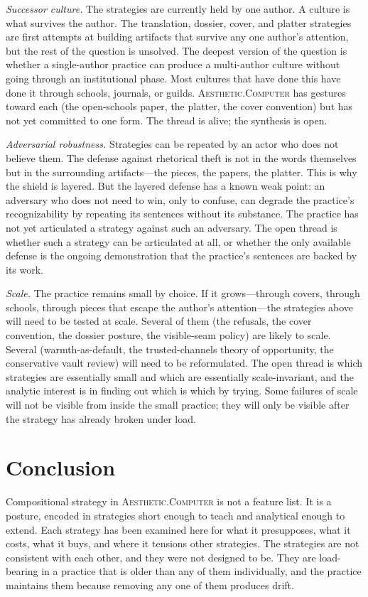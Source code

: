 \documentclass[10pt,letterpaper,twocolumn]{article}
\newcommand{\ac}{\textsc{Aesthetic.Computer}}
\begin{document}
\emph{Successor culture.} The strategies are currently held by one author. A culture is what survives the author. The translation, dossier, cover, and platter strategies are first attempts at building artifacts that survive any one author's attention, but the rest of the question is unsolved. The deepest version of the question is whether a single-author practice can produce a multi-author culture without going through an institutional phase. Most cultures that have done this have done it through schools, journals, or guilds. \ac{} has gestures toward each (the open-schools paper, the platter, the cover convention) but has not yet committed to one form. The thread is alive; the synthesis is open.

\emph{Adversarial robustness.} Strategies can be repeated by an actor who does not believe them. The defense against rhetorical theft is not in the words themselves but in the surrounding artifacts---the pieces, the papers, the platter. This is why the shield is layered. But the layered defense has a known weak point: an adversary who does not need to win, only to confuse, can degrade the practice's recognizability by repeating its sentences without its substance. The practice has not yet articulated a strategy against such an adversary. The open thread is whether such a strategy can be articulated at all, or whether the only available defense is the ongoing demonstration that the practice's sentences are backed by its work.

\emph{Scale.} The practice remains small by choice. If it grows---through covers, through schools, through pieces that escape the author's attention---the strategies above will need to be tested at scale. Several of them (the refusals, the cover convention, the dossier posture, the visible-seam policy) are likely to scale. Several (warmth-as-default, the trusted-channels theory of opportunity, the conservative vault review) will need to be reformulated. The open thread is which strategies are essentially small and which are essentially scale-invariant, and the analytic interest is in finding out which is which by trying. Some failures of scale will not be visible from inside the small practice; they will only be visible after the strategy has already broken under load.

\section{Conclusion}

Compositional strategy in \ac{} is not a feature list. It is a posture, encoded in strategies short enough to teach and analytical enough to extend. Each strategy has been examined here for what it presupposes, what it costs, what it buys, and where it tensions other strategies. The strategies are not consistent with each other, and they were not designed to be. They are load-bearing in a practice that is older than any of them individually, and the practice maintains them because removing any one of them produces drift.
\end{document}

